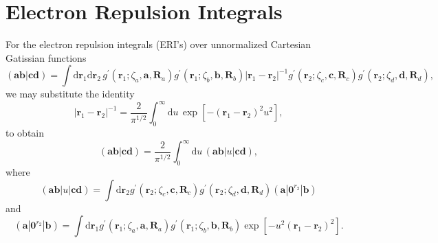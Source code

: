 \documentclass[11pt,a4paper]{article}
\begin{document}
	\section{Electron Repulsion Integrals}
	For the electron repulsion integrals (ERI's) over unnormalized Cartesian Gatissian functions
	\begin{equation}
		(\mathbf{a}\mathbf{b}|\mathbf{c}\mathbf{d}) = \int \mathrm{d} \mathbf{r}_1 \mathrm{d} \mathbf{r}_2\, g^{\prime}(\mathbf{r}_1; \zeta_a, \mathbf{a}, \mathbf{R}_a) g^{\prime}(\mathbf{r}_1; \zeta_b, \mathbf{b}, \mathbf{R}_b) \left| \mathbf{r}_1 - \mathbf{r}_2 \right|^{-1} g^{\prime}(\mathbf{r}_2; \zeta_c, \mathbf{c}, \mathbf{R}_c) g^{\prime}(\mathbf{r}_2; \zeta_d, \mathbf{d}, \mathbf{R}_d),
	\end{equation}
	we may substitute the identity
	\begin{equation}
		\left| \mathbf{r}_1 - \mathbf{r}_2 \right|^{-1} = \frac{2}{\pi^{1/2}} \int_{0}^{\infty} \mathrm{d}u\, \exp \left[ -(\mathbf{r}_1 - \mathbf{r}_2)^2 u^2 \right],
	\end{equation}
	to obtain
	\begin{equation}
		(\mathbf{a}\mathbf{b}|\mathbf{c}\mathbf{d}) = \frac{2}{\pi^{1/2}} \int_{0}^{\infty} \mathrm{d}u\, (\mathbf{a}\mathbf{b}|u|\mathbf{c}\mathbf{d}),
	\end{equation}
	where
	\begin{equation}
		(\mathbf{a}\mathbf{b}|u|\mathbf{c}\mathbf{d}) = \int \mathrm{d} \mathbf{r}_2 g^{\prime}(\mathbf{r}_2; \zeta_c, \mathbf{c}, \mathbf{R}_c) g^{\prime}(\mathbf{r}_2; \zeta_d, \mathbf{d}, \mathbf{R}_d) (\mathbf{a}|\mathbf{0}^{r_2}|\mathbf{b})
	\end{equation}
	and
	\begin{equation}
		(\mathbf{a}|\mathbf{0}^{r_2}|\mathbf{b}) = \int \mathrm{d} \mathbf{r}_1 g^{\prime}(\mathbf{r}_1; \zeta_a, \mathbf{a}, \mathbf{R}_a) g^{\prime}(\mathbf{r}_1; \zeta_b, \mathbf{b}, \mathbf{R}_b) \exp \left[ -u^2 (\mathbf{r}_1 - \mathbf{r}_2)^2 \right].
	\end{equation}
	
	
	
\end{document}
